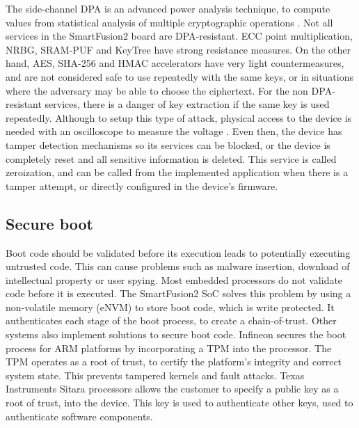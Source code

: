 The side-channel \ac{DPA} is an advanced power analysis technique, to compute values from statistical analysis of multiple cryptographic operations \cite{kocher1999differential}.
Not all services in the SmartFusion2 board are \ac{DPA}-resistant. ECC point multiplication, \ac{NRBG}, SRAM-PUF and KeyTree have strong resistance measures.
On the other hand, AES, SHA-256 and HMAC accelerators have very light countermeasures, and are not considered safe to use repeatedly with the same keys, or in situations where the adversary may be able to choose the ciphertext.
For the non \ac{DPA}-resistant services, there is a danger of key extraction if the same key is used repeatedly.
Although to setup this type of attack, physical access to the device is needed with an oscilloscope to measure the voltage \cite{dpaKocher2011}. Even then, the device has tamper detection mechanisms so its services can be blocked, or the device is completely reset and all sensitive information is deleted.
This service is called zeroization, and can be called from the implemented application when there is a tamper attempt, or directly configured in the device's firmware.

\subsection*{Secure boot}

Boot code should be validated before its execution leads to potentially executing untrusted code. This can cause problems such as malware insertion, download of intellectual property or user spying.
Most embedded processors do not validate code before it is executed. The SmartFusion2 \ac{SoC} solves this problem by using a non-volatile memory (eNVM) to store boot code, which is write protected. It authenticates each stage of the boot process, to create a chain-of-trust.
Other systems also implement solutions to secure boot code. Infineon secures the boot process for ARM platforms by incorporating a \ac{TPM} into the processor. The \ac{TPM} operates as a root of trust, to certify the platform's integrity and correct system state. This prevents tampered kernels and fault attacks.
Texas Instruments Sitara processors allows the customer to specify a public key as a root of trust, into the device. This key is used to authenticate other keys, used to authenticate software components.

